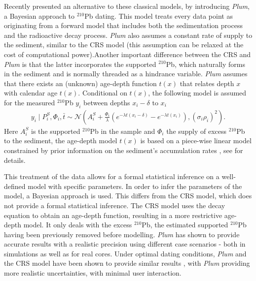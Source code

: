 \documentclass [10pt] {article}
\begin{document}
Recently \citet{Aquino2018} presented an alternative to these classical models, by introducing \textit{Plum}, a Bayesian approach to $^{210}$Pb dating.
This model treats every data point as originating from a forward model that includes both the sedimentation process and the radioactive decay process.
\textit{Plum} also assumes a constant rate of supply to the sediment, similar to the CRS model (this assumption can be relaxed at the cost of computational power).Another important difference between the CRS and \textit{Plum} is that the latter incorporates the supported $^{210}$Pb, which naturally forms in the sediment and is normally threaded as a hindrance variable.
\textit{Plum} assumes that there exists an (unknown) age-depth function $t(x)$ that relates depth $x$ with calendar age $t(x)$. 
Conditional on $t(x)$, the following model is assumed for the measured $^{210}$Pb $y_i$ between depths $x_i - \delta$ to $x_i$
\begin{eqnarray}
y_i\mid P^S_i, \Phi_i, \bar{t}\sim \mathcal{N} \left(A^S_i+\frac{\Phi_i}{\lambda} \left( e^{-\lambda t(x_i-\delta)} - e^{-\lambda t(x_i)} \right), (\sigma_i\rho_i)^2 \right). 
\end{eqnarray}
Here $A_i^S$ is the supported $^{210}$Pb in the sample and $\Phi_i$ the supply of excess $^{210}$Pb to the sediment, the age-depth model $t(x)$ is based on a piece-wise linear model constrained by prior information on the sediment's accumulation rates  \citep{Blaauw2011}, see \cite{Aquino2018} for details.

This treatment of the data allows for a formal statistical inference on a well-defined model with specific parameters. 
In order to infer the parameters of the model, a Bayesian approach is used.
This differs from the CRS model, which does not provide a formal statistical inference.
The CRS model uses the decay equation to obtain an age-depth function, resulting in a more restrictive age-depth model. 
It only deals with the excess $^{210}$Pb, the estimated supported $^{210}$Pb having been previously removed before modelling.
\textit{Plum} has shown to provide accurate results with a realistic precision using different case scenarios \citep{Aquino2018,Aquino2020} - both in simulations as well as for real cores.
Under optimal dating conditions, \textit{Plum} and the CRS model have been shown to provide similar results \citep{Aquino2020}, with \textit{Plum} providing more realistic uncertainties, with minimal user interaction. 
\end{document}
